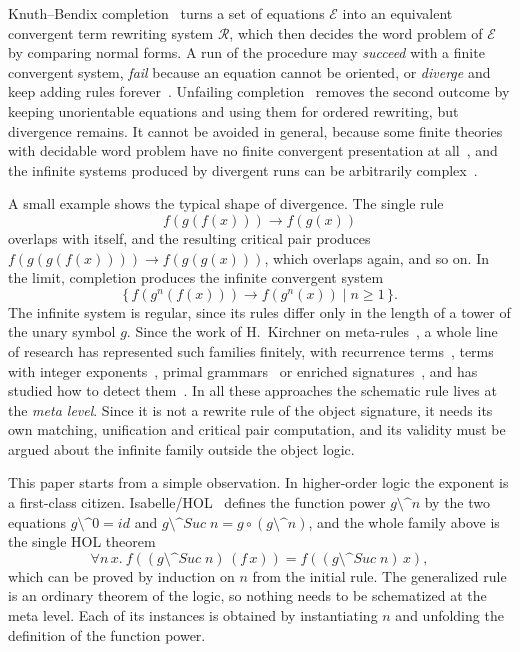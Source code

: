 \documentclass[preprint,12pt]{elsarticle}
\newcommand{\R}{\mathcal{R}}
\newcommand{\E}{\mathcal{E}}
\newcommand{\rw}{\to}
\newcommand{\pw}[2]{#1^{#2}}               %
\newcommand{\pp}{\mathbin{\texttt{\^{}\^{}}}}     %
\newcommand{\fp}[2]{(#1 \pp #2)}                  %
\newcommand{\Suc}{\mathit{Suc}}
\begin{document}
Knuth--Bendix completion~\cite{KnuthBendix70} turns a set of equations
$\E$ into an equivalent convergent term rewriting system $\R$, which then
decides the word problem of $\E$ by comparing normal forms. A run of the
procedure may \emph{succeed} with a finite convergent system, \emph{fail}
because an equation cannot be oriented, or \emph{diverge} and keep adding
rules forever~\cite{Dershowitz89,BaaderNipkow98}. Unfailing
completion~\cite{BachmairDershowitzPlaisted89} removes the second outcome
by keeping unorientable equations and using them for ordered rewriting,
but divergence remains. It cannot be avoided in general, because some
finite theories with decidable word problem have no finite convergent
presentation at all~\cite{KapurNarendran85}, and the infinite
systems produced by divergent runs can be arbitrarily
complex~\cite{HermannPrivara86,SattlerKlein91}.

A small example shows the typical shape of divergence. The single rule
\[
  f(g(f(x))) \rw f(g(x))
\]
overlaps with itself, and the resulting critical pair produces
$f(g(g(f(x)))) \rw f(g(g(x)))$, which overlaps again, and so on. In the
limit, completion produces the infinite convergent system
\[
  \{\, f(\pw{g}{n}(f(x))) \rw f(\pw{g}{n}(x)) \mid n \ge 1 \,\}.
\]
The infinite system is regular, since its rules differ only in the length
of a tower of the unary symbol $g$. Since the work of H.~Kirchner on
meta-rules~\cite{Kirchner87,Kirchner89}, a whole line of research has
represented such families finitely, with recurrence
terms~\cite{ChenHsiangKong90}, terms with integer
exponents~\cite{Comon95}, primal grammars~\cite{HermannGalbavy97} or
enriched signatures~\cite{ThomasWatson93}, and has studied how to detect
them~\cite{Hermann89,KirchnerHermann90,ThomasJantke89,DershowitzPinchover90}.
In all these approaches the schematic rule lives at the \emph{meta level}.
Since it is not a rewrite rule of the object signature, it needs its own
matching, unification and critical pair computation, and its validity must
be argued about the infinite family outside the object logic.

This paper starts from a simple observation. In higher-order logic the
exponent is a first-class citizen. Isabelle/HOL~\cite{NipkowPaulsonWenzel02}
defines the function power $g \pp n$ by the two equations
$g \pp 0 = \mathit{id}$ and
$g \pp \Suc\;n = g \circ (g \pp n)$,
and the whole family above is the single HOL theorem
\[
  \forall n\,x.\ f(\fp{g}{\Suc\;n}\,(f\,x)) = f(\fp{g}{\Suc\;n}\,x),
\]
which can be proved by induction on $n$ from the initial rule. The
generalized rule is an ordinary theorem of the logic, so nothing needs to
be schematized at the meta level. Each of its instances is obtained by
instantiating $n$ and unfolding the definition of the function power.
\end{document}
